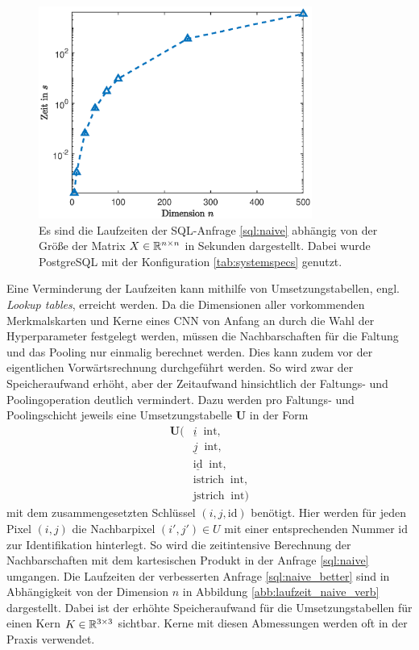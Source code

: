 \begin{figure}[h]
    \includegraphics[width=0.8\textwidth]{pics/chapters/kap5/data_plot_naive_verb.eps}
    \centering
    \caption[Laufzeiten des Nachbarschaft-Ansatzes]{Es sind die Laufzeiten der SQL-Anfrage \ref{sql:naive} abhängig von der Größe der Matrix $X \in \mathbb{R}^{n \times n}$ in Sekunden dargestellt. Dabei wurde PostgreSQL mit der Konfiguration \ref{tab:systemspecs} genutzt.}
    \label{abb:laufzeit_naive}
\end{figure}

Eine Verminderung der Laufzeiten kann mithilfe von Umsetzungstabellen, engl. \textit{Lookup tables}, erreicht werden. Da die Dimensionen aller vorkommenden Merkmalskarten und Kerne eines CNN von Anfang an durch die Wahl der Hyperparameter festgelegt werden, müssen die Nachbarschaften für die Faltung und das Pooling nur einmalig berechnet werden. Dies kann zudem vor der eigentlichen Vorwärtsrechnung durchgeführt werden. So wird zwar der Speicheraufwand erhöht, aber der Zeitaufwand hinsichtlich der Faltungs- und Poolingoperation deutlich vermindert. Dazu werden pro Faltungs- und Poolingschicht jeweils eine Umsetzungstabelle \textbf{U} in der Form 
\begin{align*}
    \mathbf{U}( &\underline{i} \; \; \mathrm{int}, \\
    &\underline{j} \; \;\mathrm{int},\\
    &\underline{\text{id}} \; \; \mathrm{int}, \\
    &\text{istrich} \; \; \mathrm{int},\\
    &\text{jstrich}\; \; \mathrm{int})
\end{align*}
mit dem zusammengesetzten Schlüssel $(i,j,\text{id})$ benötigt. Hier werden für jeden Pixel $(i,j)$ die Nachbarpixel $(i', j') \in U$ mit einer entsprechenden Nummer $\text{id}$ zur Identifikation  hinterlegt. So wird die zeitintensive Berechnung der Nachbarschaften mit dem  kartesischen Produkt in der Anfrage \ref{sql:naive} umgangen. Die Laufzeiten der verbesserten Anfrage \ref{sql:naive_better} sind in Abhängigkeit von der Dimension $n$ in Abbildung \ref{abb:laufzeit_naive_verb} dargestellt. Dabei ist der erhöhte Speicheraufwand für die Umsetzungstabellen für einen Kern $K \in \mathbb{R}^{3 \times 3}$ sichtbar. Kerne mit diesen Abmessungen werden oft in der Praxis verwendet. 

